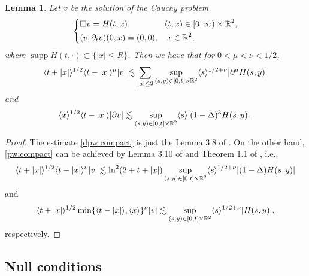 \documentclass[11pt,twoside]{article}
\def\R{\mathop{\mathbb R\kern 0pt}\nolimits}
\def\supp{\mathop{\rm supp}\nolimits}
\def\p{\partial}
\def\supp{\operatorname{supp}}
\def\ls{\lesssim}
\newcommand{\w}[1]{\langle {#1} \rangle}
\theoremstyle{plain}
\newtheorem{lemma}[theorem]{Lemma}
\theoremstyle{definition}
\numberwithin{equation}{section}
\begin{document}
\begin{lemma}\label{lem:pw:compact}
Let $v$ be the solution of the Cauchy problem
\begin{equation*}
\left\{
\begin{aligned}
&\Box v=H(t,x),\qquad\qquad(t,x)\in[0,\infty)\times\R^2,\\
&(v,\p_tv)(0,x)=(0,0),\quad x\in\R^2,
\end{aligned}
\right.
\end{equation*}
where $\supp H(t,\cdot)\subset\{|x|\le R\}$.
Then we have that for $0<\mu<\nu<1/2$,
\begin{equation}\label{pw:compact}
\w{t+|x|}^{1/2}\w{t-|x|}^{\mu}|v|\ls\sum_{|a|\le2}\sup_{(s,y)\in[0,t]\times\R^2}\w{s}^{1/2+\nu}|\p^aH(s,y)|
\end{equation}
and
\begin{equation}\label{dpw:compact}
\w{x}^{1/2}\w{t-|x|}|\p v|
\ls\sup_{(s,y)\in[0,t]\times\R^2}\w{s}|(1-\Delta)^3H(s,y)|.
\end{equation}
\end{lemma}
\begin{proof}
The estimate \eqref{dpw:compact} is just the Lemma 3.8 of \cite{HouYinYuan24}.
On the other hand, \eqref{pw:compact} can be achieved by Lemma 3.10 of \cite{HouYinYuan24} and Theorem 1.1 of \cite{Kubo15},
i.e.,
\begin{equation*}
\w{t+|x|}^{1/2}\w{t-|x|}^{\nu}|v|
\ls\ln^2(2+t+|x|)\sup_{(s,y)\in[0,t]\times\R^2}\w{s}^{1/2+\nu}|(1-\Delta)H(s,y)|
\end{equation*}
and
\begin{equation*}
\w{t+|x|}^{1/2}\min\{\w{t-|x|},\w{x}\}^{\nu}|v|\ls\sup_{(s,y)\in[0,t]\times\R^2}\w{s}^{1/2+\nu}|H(s,y)|,
\end{equation*}
respectively.
\end{proof}


\subsection{Null conditions}
\end{document}
